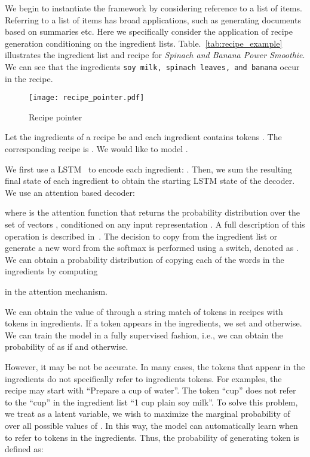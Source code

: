 \documentclass[11pt,letterpaper]{article}
\begin{document}
We begin to instantiate the framework by considering reference to a list of items.
Referring to a list of items has broad applications, such as generating documents based
on summaries etc. Here we specifically consider the application of recipe generation 
conditioning on the ingredient lists.
Table.~\ref{tab:recipe_example} illustrates the ingredient list and recipe for
{\em Spinach and Banana Power Smoothie}. We can see that the ingredients
\texttt{soy milk, spinach leaves, and banana} occur in the recipe.
\begin{figure}[!h]
  \centering
  \texttt{[image: recipe\_pointer.pdf]}
  \caption{Recipe pointer}
  \label{fig:recipe_pointer}
\end{figure}

Let the ingredients of a recipe be  and each
ingredient contains  tokens . The
corresponding recipe is . We would like to model
. 

We first use a LSTM~\cite{hochreiter1997long} to encode each ingredient:
.
Then, we sum the resulting final state of each ingredient to obtain the
starting LSTM state of the decoder. We use an attention based
decoder:

where  is the attention function that returns the
probability distribution over the set of vectors , conditioned on any input
representation . A full description of this operation is described in~\citep{BahdanauCB14}.
The decision to copy from the ingredient list or
generate a new word from the softmax is performed using a switch, denoted as
. We can obtain a probability distribution of copying each of
the words in the ingredients by computing

in the attention mechanism.

 We can obtain the value of  through a
string match of tokens in recipes with tokens in ingredients. If a token appears in the
ingredients, we set  and  otherwise.  We can train the model
in a fully supervised fashion, i.e., we can obtain the probability of  as
 if  and
 otherwise.

However, it may be not be accurate. In many cases, the tokens that appear in
the ingredients do not specifically refer to ingredients tokens. For examples, 
the recipe may start with ``Prepare a cup of water''. The token ``cup'' does not refer to the ``cup''
in the ingredient list ``1 cup plain soy milk''. To solve this problem, we treat  as a 
latent variable, we wish to maximize the marginal probability of  over 
all possible values of . In this way, the model can automatically learn when to refer 
to tokens in the ingredients. Thus, the probability of generating token  is defined as:
\end{document}
